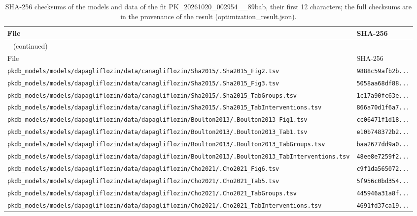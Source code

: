 \documentclass{article}
\begin{document}
\begin{longtable}{ll}
\caption{SHA-256 checksums of the models and data of the fit PK\_20261020\_002954\_\_89bab, their first 12 characters; the full checksums are in the provenance of the result (optimization\_result.json).}\label{tab:checksums:PK_20261020_002954__89bab} \\
\toprule
File & SHA-256 \\
\midrule
\endfirsthead
\multicolumn{2}{l}{\small\tablename~\thetable{} (continued)} \\
\toprule
File & SHA-256 \\
\midrule
\endhead
\bottomrule
\endlastfoot
\texttt{pkdb\_models/models/dapagliflozin/data/canagliflozin/Sha2015/.Sha2015\_Fig2.tsv} & \texttt{9888c59afb2b...} \\
\texttt{pkdb\_models/models/dapagliflozin/data/canagliflozin/Sha2015/.Sha2015\_Fig3.tsv} & \texttt{5058aa68df88...} \\
\texttt{pkdb\_models/models/dapagliflozin/data/canagliflozin/Sha2015/.Sha2015\_TabGroups.tsv} & \texttt{1c17a90fc63e...} \\
\texttt{pkdb\_models/models/dapagliflozin/data/canagliflozin/Sha2015/.Sha2015\_TabInterventions.tsv} & \texttt{866a70d1f6a7...} \\
\texttt{pkdb\_models/models/dapagliflozin/data/dapagliflozin/Boulton2013/.Boulton2013\_Fig1.tsv} & \texttt{cc06471f1d18...} \\
\texttt{pkdb\_models/models/dapagliflozin/data/dapagliflozin/Boulton2013/.Boulton2013\_Tab1.tsv} & \texttt{e10b748372b2...} \\
\texttt{pkdb\_models/models/dapagliflozin/data/dapagliflozin/Boulton2013/.Boulton2013\_TabGroups.tsv} & \texttt{baa2677dd9a0...} \\
\texttt{pkdb\_models/models/dapagliflozin/data/dapagliflozin/Boulton2013/.Boulton2013\_TabInterventions.tsv} & \texttt{48ee8e7259f2...} \\
\texttt{pkdb\_models/models/dapagliflozin/data/dapagliflozin/Cho2021/.Cho2021\_Fig6.tsv} & \texttt{c9f1da565072...} \\
\texttt{pkdb\_models/models/dapagliflozin/data/dapagliflozin/Cho2021/.Cho2021\_Tab5.tsv} & \texttt{5f956c0bd354...} \\
\texttt{pkdb\_models/models/dapagliflozin/data/dapagliflozin/Cho2021/.Cho2021\_TabGroups.tsv} & \texttt{445946a31a8f...} \\
\texttt{pkdb\_models/models/dapagliflozin/data/dapagliflozin/Cho2021/.Cho2021\_TabInterventions.tsv} & \texttt{4691fd37ca19...} \\

\end{longtable}
\end{document}
